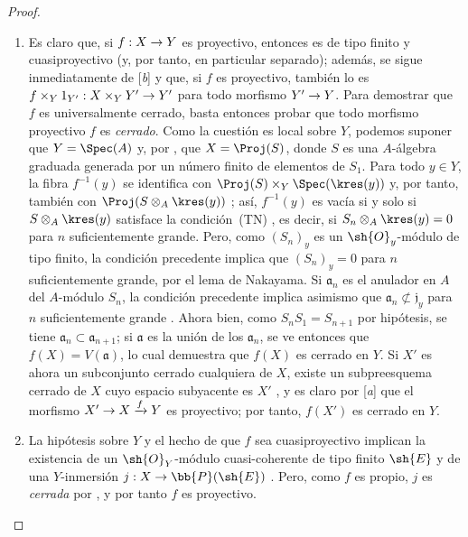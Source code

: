 \documentclass[oneside,10pt]{amsart}
\makeatletter
\newcommand{\ega@arrow}[2]{\mathchoice{#1}{#2}{#2}{#2}}
\renewcommand{\to}{\ega@arrow{\longrightarrow}{\rightarrow}}
\makeatother
\begin{document}
\begin{proof}
\medskip\noindent
\begin{enumerate}
  \item[(i)] Es claro que, si $f:X\to Y$ es proyectivo, entonces es de tipo finito y cuasiproyectivo (y, por tanto, en particular separado); además, se sigue inmediatamente de [\emph{b}] y  que, si $f$ es proyectivo, también lo es $f\times_Y 1_{Y'}:X\times_Y Y'\to Y'$ para todo morfismo $Y'\to Y$.
    Para demostrar que $f$ es universalmente cerrado, basta entonces probar que todo morfismo proyectivo $f$ es \emph{cerrado}.
    Como la cuestión es local sobre $Y$, podemos suponer que $Y=\Spec(A)$ y, por , que $X=\Proj(S)$, donde $S$ es una $A$-álgebra graduada generada por un número finito de elementos de $S_1$.
    Para todo $y\in Y$, la fibra $f^{-1}(y)$ se identifica con $\Proj(S)\times_Y\Spec(\kres(y))$  y, por tanto, también con $\Proj(S\otimes_A\kres(y))$ ;
    así, $f^{-1}(y)$ es vacía si y solo si $S\otimes_A\kres(y)$ satisface la condición~(TN) , es decir, si $S_n\otimes_A\kres(y)=0$ para $n$ suficientemente grande.
    Pero, como $(S_n)_y$ es un $\sh{O}_y$-módulo de tipo finito, la condición precedente implica que $(S_n)_y=0$ para $n$ suficientemente grande, por el lema de Nakayama.
    Si $\mathfrak{a}_n$ es el anulador en $A$ del $A$-módulo $S_n$, la condición precedente implica asimismo que $\mathfrak{a}_n\not\subset\mathfrak{j}_y$ para $n$ suficientemente grande .
    Ahora bien, como $S_nS_1=S_{n+1}$ por hipótesis, se tiene $\mathfrak{a}_n\subset\mathfrak{a}_{n+1}$; si $\mathfrak{a}$ es la unión de los $\mathfrak{a}_n$, se ve entonces que $f(X)=V(\mathfrak{a})$, lo cual demuestra que $f(X)$ es cerrado en $Y$.
    Si $X'$ es ahora un subconjunto cerrado cualquiera de $X$, existe un subpreesquema cerrado de $X$ cuyo espacio subyacente es $X'$ , y es claro por [\emph{a}] que el morfismo $X'\to X\xrightarrow{f}Y$ es proyectivo; por tanto, $f(X')$ es cerrado en $Y$.
  \item[(ii)] La hipótesis sobre $Y$ y el hecho de que $f$ sea cuasiproyectivo implican la existencia de un $\sh{O}_Y$-módulo cuasi-coherente de tipo finito $\sh{E}$ y de una $Y$-inmersión $j:X\to\bb{P}(\sh{E})$ .
    Pero, como $f$ es propio, $j$ es \emph{cerrada} por , y por tanto $f$ es proyectivo.
\end{enumerate}
\end{proof}
\end{document}
